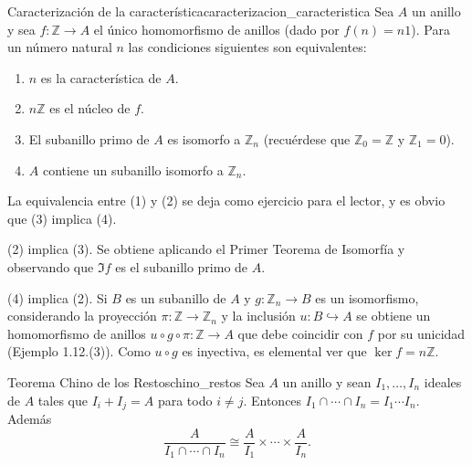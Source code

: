 \begin{proposition}{Caracterización de la característica}{caracterizacion_caracteristica}
Sea $A$ un anillo y sea $f : \mathbb{Z} \to A$ el único homomorfismo de anillos (dado por $f(n) = n1$). Para un número natural $n$ las condiciones siguientes son equivalentes:
\begin{enumerate}
    \item $n$ es la característica de $A$.
    \item $n\mathbb{Z}$ es el núcleo de $f$.
    \item El subanillo primo de $A$ es isomorfo a $\mathbb{Z}_n$ (recuérdese que $\mathbb{Z}_0 = \mathbb{Z}$ y $\mathbb{Z}_1 = 0$).
    \item $A$ contiene un subanillo isomorfo a $\mathbb{Z}_n$.
\end{enumerate}
\end{proposition}

\begin{proofbox}
La equivalencia entre (1) y (2) se deja como ejercicio para el lector, y es obvio que (3) implica (4).

(2) implica (3). Se obtiene aplicando el Primer Teorema de Isomorfía y observando que $\Im f$ es el subanillo primo de $A$.

(4) implica (2). Si $B$ es un subanillo de $A$ y $g : \mathbb{Z}_n \to B$ es un isomorfismo, considerando la proyección $\pi : \mathbb{Z} \to \mathbb{Z}_n$ y la inclusión $u : B \hookrightarrow A$ se obtiene un homomorfismo de anillos $u \circ g \circ \pi : \mathbb{Z} \to A$ que debe coincidir con $f$ por su unicidad (Ejemplo 1.12.(3)). Como $u \circ g$ es inyectiva, es elemental ver que $\ker f = n\mathbb{Z}$.
\end{proofbox}

\begin{theorem}{Teorema Chino de los Restos}{chino_restos}
Sea $A$ un anillo y sean $I_1, \ldots, I_n$ ideales de $A$ tales que $I_i + I_j = A$ para todo $i \neq j$. Entonces $I_1 \cap \cdots \cap I_n = I_1 \cdots I_n$. Además
\[
\frac{A}{I_1 \cap \cdots \cap I_n} \cong \frac{A}{I_1} \times \cdots \times \frac{A}{I_n}.
\]
\end{theorem}

